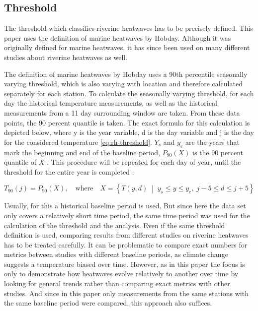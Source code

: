 \documentclass[
]{krantz}
\begin{document}
\subsection{Threshold}\label{threshold}

The threshold which classifies riverine heatwaves has to be precisely defined. This paper uses the definition
of marine heatwaves by Hobday. Although it was originally defined for marine heatwaves, it has since been used on many
different studies about riverine heatwaves as well.

The definition of marine heatwaves by Hobday uses a 90th percentile seasonally varying threshold, which is also varying
with location and therefore calculated separately for each station. To calculate the seasonally varying threshold, for
each day the historical temperature measurements, as well as the historical measurements from a 11 day surrounding
window are taken. From these data points, the 90 percent quantile is taken. The exact formula for this calculation is
depicted below, where y is the year variable, d is the day variable and j is the day for the considered temperature \eqref{eq:rh-threshold}. \(Y_s\) and \(y_e\) are the years that mark the beginning and end of the baseline period, \(P_{90}(X)\) is the 90 percent
quantile of \(X\) . This procedure will be repeated for each day of year, until the threshold for the entire year is
completed \citep{hobday2016}.

\begin{equation}
T_{90}(j) = P_{90}(X),
\quad \text{where}
\quad
X = \left\{T(y,d)\;\middle|\; y_s \le y \le y_e,\; j-5 \le d \le j+5 \right\}
\label{eq:rh-threshold}
\end{equation}

Usually, for this a historical baseline period is used. But since here the data set only covers a relatively short time
period, the same time period was used for the calculation of the threshold and the analysis. Even if the same threshold
definition is used, comparing results from different studies on riverine heatwaves has to be treated carefully. It can
be problematic to compare exact numbers for metrics between studies with different baseline periods, as climate change
suggests a temperature biased over time. However, as in this paper the focus is only to demonstrate how heatwaves evolve
relatively to another over time by looking for general trends rather than comparing exact metrics with other studies.
And since in this paper only measurements from the same stations with the same baseline period were compared, this
approach also suffices.
\end{document}
